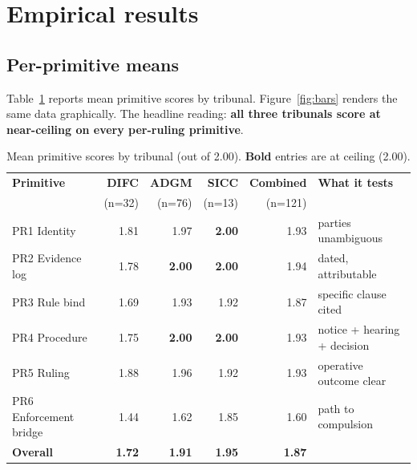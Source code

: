 \documentclass[11pt,letterpaper]{article}
\begin{document}
\section{Empirical results}

\subsection{Per-primitive means}

Table~\ref{tab:means} reports mean primitive scores by tribunal. Figure~\ref{fig:bars} renders the same data graphically. The headline reading: \textbf{all three tribunals score at near-ceiling on every per-ruling primitive}.

\begin{table}[h]
\centering
\caption{Mean primitive scores by tribunal (out of 2.00). \textbf{Bold} entries are at ceiling (2.00).}
\label{tab:means}
\small
\begin{tabular}{l r r r r l}
\toprule
\textbf{Primitive} & \textbf{DIFC} & \textbf{ADGM} & \textbf{SICC} & \textbf{Combined} & \textbf{What it tests} \\
& \tiny{(n=32)} & \tiny{(n=76)} & \tiny{(n=13)} & \tiny{(n=121)} & \\
\midrule
PR1 Identity            & 1.81 & 1.97 & \textbf{2.00} & 1.93 & parties unambiguous \\
PR2 Evidence log        & 1.78 & \textbf{2.00} & \textbf{2.00} & 1.94 & dated, attributable \\
PR3 Rule bind           & 1.69 & 1.93 & 1.92 & 1.87 & specific clause cited \\
PR4 Procedure           & 1.75 & \textbf{2.00} & \textbf{2.00} & 1.93 & notice + hearing + decision \\
PR5 Ruling              & 1.88 & 1.96 & 1.92 & 1.93 & operative outcome clear \\
PR6 Enforcement bridge  & 1.44 & 1.62 & 1.85 & 1.60 & path to compulsion \\
\midrule
\textbf{Overall}        & \textbf{1.72} & \textbf{1.91} & \textbf{1.95} & \textbf{1.87} & \\
\bottomrule
\end{tabular}
\end{table}
\end{document}
